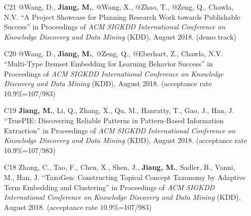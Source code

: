 \documentclass[10pt]{article}
\newenvironment{myindentpar}[1]%
{\begin{list}{}%
         {\setlength{\leftmargin}{#1}}%
         \item[]%
}
{\end{list}}
\newcounter{list}
\begin{document}
\begin{myindentpar}{0.00cm}
\begin{enumerate}[leftmargin=.5cm]
\vspace{-0.1cm}

\item[C21] @Wang, D., \textbf{Jiang, M.}, @Wang, X., @Zhao, T., @Zeng, Q., Chawla, N.V. ``A Project Showcase for Planning Research Work towards Publishable Success'' in Proceedings of \emph{ACM SIGKDD International Conference on Knowledge Discovery and Data Mining} (KDD), August 2018. (demo track)

\vspace{-0.1cm}

\item[C20] @Wang, D., \textbf{Jiang, M.}, @Zeng, Q., @Eberhart, Z., Chawla, N.V. ``Multi-Type Itemset Embedding for Learning Behavior Success'' in Proceedings of \emph{ACM SIGKDD International Conference on Knowledge Discovery and Data Mining} (KDD), August 2018. (acceptance rate 10.9\%=107/983)

\vspace{-0.1cm}

\item[C19] \textbf{Jiang, M.}, Li, Q., Zhang, X., Qu, M., Hanratty, T., Gao, J., Han, J. ``TruePIE: Discovering Reliable Patterns in Pattern-Based Information Extraction'' in Proceedings of \emph{ACM SIGKDD International Conference on Knowledge Discovery and Data Mining} (KDD), August 2018. (acceptance rate 10.9\%=107/983)

\vspace{-0.1cm}

\item[C18] Zhang, C., Tao, F., Chen, X., Shen, J., \textbf{Jiang, M.}, Sadler, B., Vanni, M., Han, J. ``TaxoGen: Constructing Topical Concept Taxonomy by Adaptive Term Embedding and Clustering'' in Proceedings of \emph{ACM SIGKDD International Conference on Knowledge Discovery and Data Mining} (KDD), August 2018. (acceptance rate 10.9\%=107/983)


\end{enumerate}
\end{myindentpar}
\end{document}
